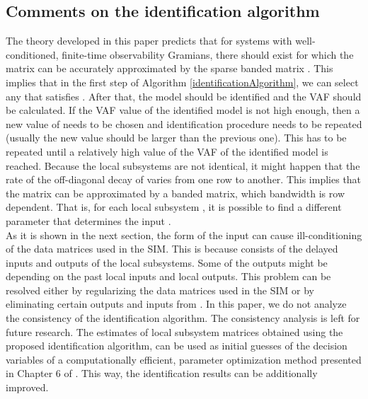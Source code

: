 \documentclass[journal,10pt]{IEEEtran}
\begin{document}
\subsection{Comments on the identification algorithm}
\label{commentsSubSection}
The theory developed in this paper predicts that for systems with well-conditioned, finite-time observability Gramians, there should exist  for which the matrix  can be accurately approximated by the sparse banded matrix . This implies that in the first step of Algorithm \ref{identificationAlgorithm}, we can select any  that satisfies .  
After that, the model should be identified and the VAF should be calculated. If the VAF value of the identified model is not high enough, then a new value of  needs to be chosen and identification procedure needs to be repeated (usually the new value should be larger than the previous one). This has to be repeated until a relatively high value of the VAF of the identified model is reached. Because the local subsystems are not identical, it might happen that the rate of the off-diagonal decay of  varies from one row to another. This implies that the matrix  can be approximated by a banded matrix, which bandwidth is row dependent. That is, for each local subsystem , it is possible to find a different parameter  that determines the input .  
\\
As it is shown in the next section, the form of the input  can cause ill-conditioning of the data  matrices used in the SIM. This is because  consists of the delayed inputs and outputs of the local subsystems. Some of the outputs might be depending on the past local inputs and local outputs. This problem can be resolved either by regularizing the data matrices used in the SIM or by eliminating certain outputs and inputs from . In this paper, we do not analyze the consistency of the identification algorithm. The consistency analysis is left for future research. The estimates of local subsystem matrices obtained using the proposed identification algorithm, can be used as initial guesses of the decision variables of a computationally efficient, parameter optimization method presented in Chapter 6 of \cite{haberThesis}. This way, the identification results can be additionally improved.
\end{document}
